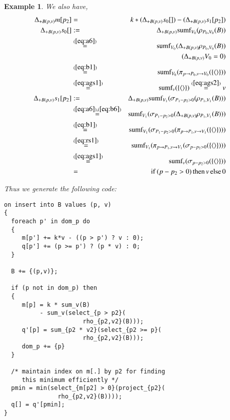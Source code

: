 \documentclass{article}
\newtheorem{example}[theorem]{Example}
\newcommand{\tuple}[1]{{\langle#1\rangle}}
\begin{document}
\begin{example}
%
%
%
%
%
%
We also have,
\begin{eqnarray*}
\Delta_{+B(p,v)} m[p_2] &=& k * 
(\Delta_{+B(p,v)} s_0[]) - (\Delta_{+B(p,v)} s_1[p_2]) 
\\
\Delta_{+B(p,v)} s_0[] &:=&
   \Delta_{+B(p,v)} \algsumf_{V_0}(\rho_{P_0, V_0}(B))
\\
&\stackrel{(\ref{eq:a6})}{=}& 
   \algsumf_{V_0}(\Delta_{+B(p,v)} \rho_{P_0, V_0}(B))
\\
&& \quad (\Delta_{+B(p,v)} V_0 = 0)
\\
&\stackrel{(\ref{eq:b1})}{=}&
\algsumf_{V_0}(\pi_{p \rightarrow P_0, v \rightarrow V_0}(\{\tuple{}\}))
\\
&\stackrel{(\ref{eq:ags1})}{=}& \algsumf_v(\{\tuple{}\})
\stackrel{(\ref{eq:ags2})}{=}
v
\\
\Delta_{+B(p,v)} s_1[p_2] &:=&
   \Delta_{+B(p,v)} \algsumf_{V_1}(\sigma_{P_1 - p_2 > 0}(\rho_{P_1, V_1}(B)))
\\
&\stackrel{(\ref{eq:a6}), (\ref{eq:b6})}{=}&
\algsumf_{V_1}(\sigma_{P_1 - p_2 > 0}(\Delta_{+B(p,v)} \rho_{P_1, V_1}(B)))
\\
&\stackrel{(\ref{eq:b1})}{=}&
\algsumf_{V_1}(\sigma_{P_1 - p_2 > 0}(\pi_{p \rightarrow P_1, v \rightarrow V_1}(\{\tuple{}\})))
\\
&\stackrel{(\ref{eq:rs1})}{=}&
\algsumf_{V_1}(\pi_{p \rightarrow P_1, v \rightarrow V_1}(\sigma_{p - p_2 > 0}(\{\tuple{}\})))
\\
&\stackrel{(\ref{eq:ags1})}{=}&
\algsumf_{v}(\sigma_{p - p_2 > 0}(\{\tuple{}\}))
\\
&=& \mathrm{if}\, (p - p_2 > 0) \, \mathrm{then}\, v \, \mathrm{else} \, 0
\end{eqnarray*}


Thus we generate the following code:
\begin{verbatim}
on insert into B values (p, v)
{
  foreach p' in dom_p do
  {
     m[p'] += k*v - ((p > p') ? v : 0);
     q[p'] += (p >= p') ? (p * v) : 0;
  }

  B += {(p,v)};

  if (p not in dom_p) then
  {
     m[p] = k * sum_v(B)
          - sum_v(select_{p > p2}(
                      rho_{p2,v2}(B)));
     q'[p] = sum_{p2 * v2}(select_{p2 >= p}(
                      rho_{p2,v2}(B)));
     dom_p += {p}
  }

  /* maintain index on m[.] by p2 for finding
     this minimum efficiently */
  pmin = min(select_{m[p2] > 0}(project_{p2}(
               rho_{p2,v2}(B))));
  q[] = q'[pmin];
}
\end{verbatim}
%
\end{example}
\end{document}
